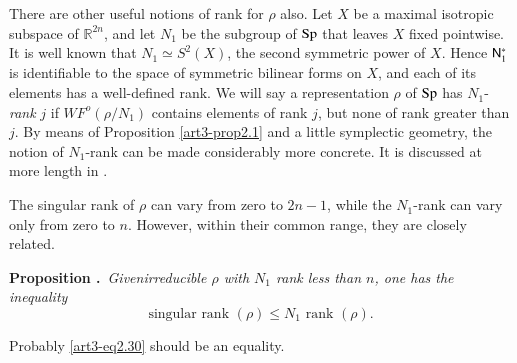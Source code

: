 There are other useful notions of rank for $\rho$ also. Let $X$ be a maximal isotropic subspace of $\mathbb{R}^{2n}$, and let $N_{1}$ be the subgroup of $\operatorname{Sp}$ that leaves $X$ fixed pointwise. It is well known that $N_{1}\simeq S^{2}(X)$, the second symmetric power of $X$. Hence $\mathsf{N}^{*}_{1}$ is identifiable to the space of symmetric bilinear forms on $X$, and each of its elements has a well-defined rank. We will say a representation $\rho$ of $\operatorname{Sp}$ has $N_{1}$-{\em rank} $j$ if $WF^{o}(\rho/N_{1})$ contains elements of rank $j$, but none of rank greater than $j$. By means of Proposition \ref{art3-prop2.1} and a little symplectic geometry, the notion of $N_{1}$-rank can be made considerably more concrete. It is discussed at more length in \cite{art3-H2}.

The singular rank of $\rho$ can vary from zero to $2n-1$, while the $N_{1}$-rank can vary only from zero to $n$. However, within their common range, they are closely related.

\medskip
\noindent
{\bf Proposition .\label{art3-prop2.7}}~{\em Given\pageoriginale irreducible $\rho$ with $N_{1}$ rank less than $n$, one has the inequality}
\begin{equation*}
\text{singular rank $(\rho)\leq N_{1}$ rank $(\rho)$.}\tag{2.30}\label{art3-eq2.30}
\end{equation*}

Probably \eqref{art3-eq2.30} should be an equality.

